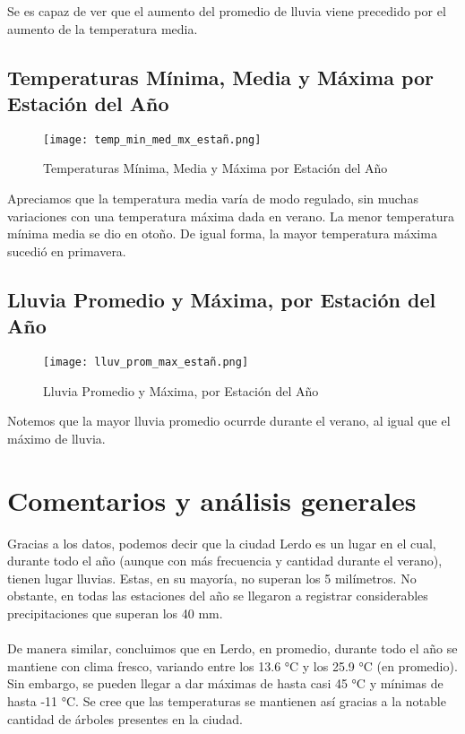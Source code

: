 \documentclass[12pt]{article}
\begin{document}
Se es capaz de ver que el aumento del promedio de lluvia viene precedido por el aumento de la temperatura media.
\clearpage

\subsection{Temperaturas Mínima, Media y Máxima por Estación del Año}

\begin{figure}[H]
    \centering
    \texttt{[image: temp\_min\_med\_mx\_estañ.png]}
    \caption{Temperaturas Mínima, Media y Máxima por Estación del Año}
\end{figure}

Apreciamos que la temperatura media varía de modo regulado, sin muchas variaciones con una temperatura máxima dada en verano. La menor temperatura mínima media se dio en otoño. De igual forma, la mayor temperatura máxima sucedió en primavera.
\clearpage

\subsection{Lluvia Promedio y Máxima, por Estación del Año}

\begin{figure}[H]
    \centering
    \texttt{[image: lluv\_prom\_max\_estañ.png]}
    \caption{Lluvia Promedio y Máxima, por Estación del Año}
\end{figure}

Notemos que la mayor lluvia promedio ocurrde durante el verano, al igual que el máximo de lluvia.
\clearpage

\section{Comentarios y análisis generales}

Gracias a los datos, podemos decir que la ciudad Lerdo es un lugar en el cual, durante todo el año (aunque con más frecuencia y cantidad durante el verano), tienen lugar lluvias. Estas, en su mayoría, no superan los 5 milímetros. No obstante, en todas las estaciones del año se llegaron a registrar considerables precipitaciones que superan los 40 mm.\\\\De manera similar, concluimos que en Lerdo, en promedio, durante todo el año se mantiene con clima fresco, variando entre los 13.6 °C y los 25.9 °C (en promedio). Sin embargo, se pueden llegar a dar máximas de hasta casi 45 °C y mínimas de hasta -11 °C. Se cree que las temperaturas se mantienen así gracias a la notable cantidad de árboles presentes en la ciudad.
\end{document}
